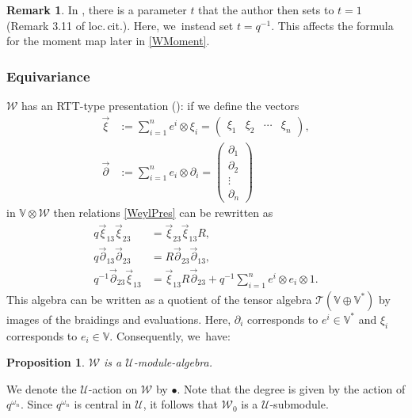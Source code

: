 \documentclass[JEP,XML,SOM,Unicode,published]{cedram}
\newtheorem{prop}[thm]{Proposition}
\theoremstyle{definition}
\newtheorem{rem}[thm]{Remark}
\newcommand{\UU}{\mathcal{U}}
\newcommand{\WW}{\mathcal{W}}
\newcommand{\del}{\partial}
\begin{document}
\begin{rem}
In \cite{JordanMult}, there is a parameter $t$ that the author then sets to $t=1$ (\cf Remark 3.11 of loc.\,cit.).
Here, we~instead set $t=q^{-1}$.
This affects the formula for the moment map later in \ref{WMoment}.
\end{rem}

\subsubsection{Equivariance}
$\WW$ has an RTT-type presentation (\cf \cite[Ex.\,4.9]{JordanMult}): if we define the vectors
\begin{align*}
\vec{\xi}&:= \sum_{i=1}^n e^i\otimes \xi_i
=
\begin{pmatrix}
\xi_1 & \xi_2 & \cdots & \xi_n
\end{pmatrix}\!,
\\
\vec{\del}&:=\sum_{i=1}^ne_i\otimes \del_i
=
\begin{pmatrix}
\partial_1\\
\partial_2\\
\vdots\\
\partial_n
\end{pmatrix}
\end{align*}
in $\mathbb{V}\otimes\WW$ then relations \eqref{WeylPres} can be rewritten as
\begin{equation*}
\begin{aligned}
q\vec{\xi}_{13}\vec{\xi}_{23}&=\vec{\xi}_{23}\vec{\xi}_{13}R,\\
q\vec{\del}_{13}\vec{\del}_{23}&=R\vec{\del}_{23}\vec{\del}_{13},\\[-6pt]
q^{-1}\vec{\del}_{23}\vec{\xi}_{13}&=\vec{\xi}_{13}R\vec{\del}_{23}+q^{-1}\sum_{i=1}^n e^i\otimes e_i\otimes 1.
\end{aligned}
\end{equation*}
This algebra can be written as a quotient of the tensor algebra $\mathcal{T}(\mathbb{V}\oplus\mathbb{V}^*)$ by images of the braidings and evaluations.
Here, $\del_i$ corresponds to $e^i\in\mathbb{V}^*$ and $\xi_i$ corresponds to $e_i\in\mathbb{V}$.
Consequently, we~have:
\begin{prop}\label{WeylEquiv}
$\WW$ is a $\UU$-module-algebra.
\end{prop}
We denote the $\UU$-action on $\WW$ by $\bullet$.
Note that the degree is given by the action of $q^{\omega_n}$.
Since $q^{\omega_n}$ is central in $\UU$, it follows that $\WW_0$ is a $\UU$-submodule.
\end{document}
